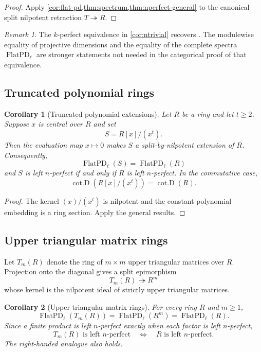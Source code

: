 \documentclass[11pt,reqno]{amsart}
\newcommand{\cotD}{\operatorname{cot.D}}
\newcommand{\FlatPD}{\operatorname{FlatPD}}
\theoremstyle{plain}
\newtheorem{corollary}[corollary]{Corollary}
\theoremstyle{definition}
\theoremstyle{remark}
\newtheorem{remark}[remark]{Remark}
\begin{document}
\begin{proof}
Apply \cref{cor:flat-pd,thm:spectrum,thm:nperfect-general} to the canonical split
nilpotent retraction $T\twoheadrightarrow R$.
\end{proof}

\begin{remark}\label{rem:ntrivial-literature}
The $k$-perfect equivalence in \cref{cor:ntrivial} recovers
\cite[Theorem~4.2]{BenkhadraBennisGarcia2020}.  The modulewise equality of
projective dimensions and the equality of the complete spectra
$\FlatPD_{\ell}$ are stronger statements not needed in the categorical proof of
that equivalence.
\end{remark}

\subsection{Truncated polynomial rings}

\begin{corollary}[Truncated polynomial extensions]\label{cor:truncated}
Let $R$ be a ring and let $t\ge2$.  Suppose $x$ is central over $R$ and set
\[
   S=R[x]/(x^t).
\]
Then the evaluation map $x\mapsto0$ makes $S$ a split-by-nilpotent extension of
$R$.  Consequently,
\[
  \FlatPD_{\ell}(S)=\FlatPD_{\ell}(R)
\]
and $S$ is left $n$-perfect if and only if $R$ is left $n$-perfect.  In the
commutative case,
\[
  \cotD(R[x]/(x^t))=\cotD(R).
\]
\end{corollary}

\begin{proof}
The kernel $(x)/(x^t)$ is nilpotent and the constant-polynomial embedding is a ring
section.  Apply the general results.
\end{proof}

\subsection{Upper triangular matrix rings}

Let $T_m(R)$ denote the ring of $m\times m$ upper triangular matrices over $R$.
Projection onto the diagonal gives a split epimorphism
\[
  T_m(R)\twoheadrightarrow R^m
\]
whose kernel is the nilpotent ideal of strictly upper triangular matrices.

\begin{corollary}[Upper triangular matrix rings]\label{cor:triangular}
For every ring $R$ and $m\ge1$,
\[
  \FlatPD_{\ell}(T_m(R))=\FlatPD_{\ell}(R^m)=\FlatPD_{\ell}(R).
\]
Since a finite product is left $n$-perfect exactly when each factor is left
$n$-perfect,
\[
  T_m(R)\text{ is left }n\text{-perfect}
  \quad\Longleftrightarrow\quad
  R\text{ is left }n\text{-perfect}.
\]
The right-handed analogue also holds.
\end{corollary}
\end{document}
